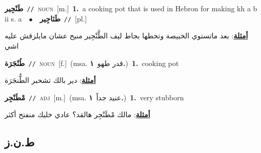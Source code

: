 \documentclass[10pt,a4paper,twoside]{article} %
\begin{document}
\begin{multicols}{2}
{\setlength\topsep{0pt}\textbf{\foreignlanguage{arabic}{طَنْجِير}}\ {\color{gray}\texttt{//}\color{black}}\ \textsc{noun}\ [m.]\ \textbf{1.}~a cooking pot that is used in Hebron for making kh a b ii s. a\ \ $\bullet$\ \ \setlength\topsep{0pt}\textbf{\foreignlanguage{arabic}{طَنَاجِير}}\ {\color{gray}\texttt{//}\color{black}}\ [pl.]\  \begin{flushright}\color{gray}\foreignlanguage{arabic}{\textbf{\underline{\foreignlanguage{arabic}{أمثلة}}}: بعد ماتستوي الخبيصة وتحطها بجاط ليف الطَّنْجِير منيح عشان مايلزقش عليه اشي}\end{flushright}\color{black}} \vspace{2mm}

{\setlength\topsep{0pt}\textbf{\foreignlanguage{arabic}{طُنْجَرَة}}\ {\color{gray}\texttt{//}\color{black}}\ \textsc{noun}\ [f.]\ \color{gray}(msa. \foreignlanguage{arabic}{قدر طهو}~\foreignlanguage{arabic}{\textbf{١.}})\color{black}\ \textbf{1.}~cooking pot\  \begin{flushright}\color{gray}\foreignlanguage{arabic}{\textbf{\underline{\foreignlanguage{arabic}{أمثلة}}}: دير بالك تشحبر الطُّنجَرَة}\end{flushright}\color{black}} \vspace{2mm}

{\setlength\topsep{0pt}\textbf{\foreignlanguage{arabic}{مْطَنْجِر}}\ {\color{gray}\texttt{//}\color{black}}\ \textsc{adj}\ [m.]\ \color{gray}(msa. \foreignlanguage{arabic}{عنيد جداً}~\foreignlanguage{arabic}{\textbf{١.}})\color{black}\ \textbf{1.}~very stubborn\  \begin{flushright}\color{gray}\foreignlanguage{arabic}{\textbf{\underline{\foreignlanguage{arabic}{أمثلة}}}: مالك مْطَنْجِر هالقد؟ عادي خليك منفتح أكثر}\end{flushright}\color{black}} \vspace{2mm}

\vspace{-3mm}
\subsection*{\color{blue}\foreignlanguage{arabic}{ط.ن.ز}\color{blue}{}} 


\end{multicols}
\end{document}
